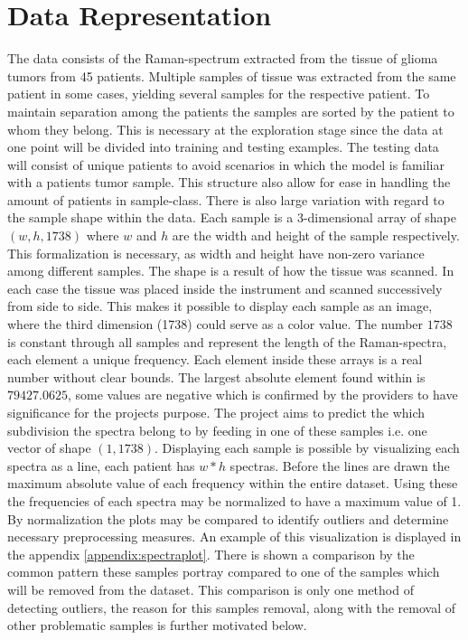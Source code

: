 \section{Data Representation}
The data consists of the Raman-spectrum extracted from the tissue of glioma tumors from 45 patients. Multiple samples of tissue was extracted from the same patient in some cases, yielding several samples for the respective patient. To maintain separation among the patients the samples are sorted by the patient to whom they belong. This is necessary at the exploration stage since the data at one point will be divided into training and testing examples. The testing data will consist of unique patients to avoid scenarios in which the model is familiar with a patients tumor sample. This structure also allow for ease in handling the amount of patients in sample-class. There is also large variation with regard to the sample shape within the data. Each sample is a 3-dimensional array of shape $(w, h, 1738)$ where $w$ and $h$ are the width and height of the sample respectively. This formalization is necessary, as width and height have non-zero variance among different samples. The shape is a result of how the tissue was scanned. In each case the tissue was placed inside the instrument and scanned successively from side to side. This makes it possible to display each sample as an image, where the third dimension (1738) could serve as a color value. The number $1738$ is constant through all samples and represent the length of the Raman-spectra, each element a unique frequency. Each element inside these arrays is a real number without clear bounds. The largest absolute element found within is $79427.0625$, some values are negative which is confirmed by the providers to have significance for the projects purpose. The project aims to predict the which subdivision the spectra belong to by feeding in one of these samples i.e. one vector of shape $(1, 1738)$. Displaying each sample is possible by visualizing each spectra as a line, each patient has $w * h$ spectras. Before the lines are drawn the maximum absolute value of each frequency within the entire dataset. Using these the frequencies of each spectra may be normalized to have a maximum value of 1. By normalization the plots may be compared to identify outliers and determine necessary preprocessing measures. An example of this visualization is displayed in the appendix \ref{appendix:spectraplot}. There is shown a comparison by the common pattern these samples portray compared to one of the samples which will be removed from the dataset. This comparison is only one method of detecting outliers, the reason for this samples removal, along with the removal of other problematic samples is further motivated below.


